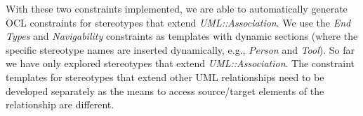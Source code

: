 \begin{figure}[h]
	
	
	\vspace*{-5mm}
\end{figure}

With these two constraints implemented, we are able to automatically generate OCL constraints for stereotypes that extend \emph{UML::Association}. 
We use the \emph{End Types} and \emph{Navigability} constraints as templates with dynamic sections (where the specific stereotype names are inserted dynamically, e.g., \emph{Person} and \emph{Tool}). 
So far we have only explored stereotypes that extend \emph{UML::Association}. 
The constraint templates for stereotypes that extend other UML relationships need to be developed separately as the means to 
access source/target elements of the relationship are different.


